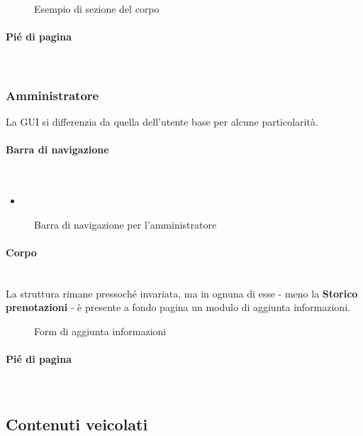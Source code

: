 \begin{figure}[h!]
	\caption{Esempio di sezione del corpo}
	\label{fig:corpoGU}
\end{figure}
\paragraph{Pié di pagina}
~\\

\begin{figure}[h!]
	\label{fig:footer}
\end{figure}
\subsubsection{Amministratore}
La GUI si differenzia da quella dell'utente base per alcune particolarità.
\paragraph{Barra di navigazione}
~\\
\begin{itemize}
	\item \textbf{}
\end{itemize}

\begin{figure}[h!]
	\caption{Barra di navigazione per l'amministratore}
	\label{fig:navbarAD}
\end{figure}
\paragraph{Corpo}
~\\La struttura rimane pressoché invariata, ma in ognuna di esse - meno la \textbf{Storico prenotazioni} - è presente a fondo pagina un modulo di aggiunta informazioni.
\begin{figure}[h!]
	\caption{Form di aggiunta informazioni}
	\label{fig:addForm}
\end{figure}

\paragraph{Pié di pagina}
~\\
\subsection{Contenuti veicolati}

